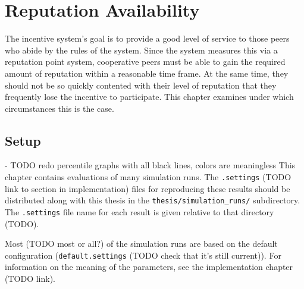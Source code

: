 \chapter{Reputation Availability}
\label{chap:rep_avail}
The incentive system's goal is to provide a good level of service to those peers
who abide by the rules of the system. Since the system measures this via a
reputation point system, cooperative peers must be able to gain the required
amount of reputation within a reasonable time frame. At the same time, they
should not be so quickly contented with their level of reputation that they
frequently lose the incentive to participate. This chapter examines under which
circumstances this is the case.

\section{Setup}
- TODO redo percentile graphs with all black lines, colors are meaningless
This chapter contains evaluations of many simulation runs. The
\texttt{.settings} (TODO link to section in implementation) files for
reproducing these results should be distributed along with this thesis in the
\texttt{thesis/simulation\_runs/} subdirectory. The \texttt{.settings} file name
for each result is given relative to that directory (TODO).

Most (TODO most or all?) of the simulation runs are based on the default
configuration (\texttt{default.settings} (TODO check that it's still current)).
For information on the meaning of the parameters, see the implementation chapter
(TODO link).

